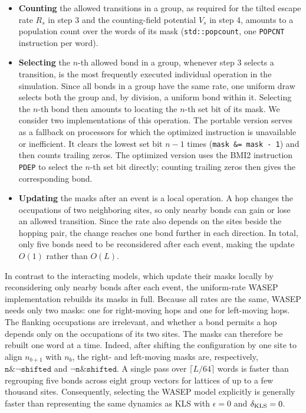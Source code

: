 \documentclass[11pt]{article}
\begin{document}
\begin{itemize}
\item \textbf{Counting} the allowed transitions in a group, as required for the tilted escape rate $R_s$ in step 3 and the counting-field potential $V_s$ in step 4, amounts to a population count over the words of its mask (\texttt{std::popcount}, one \texttt{POPCNT} instruction per word).

\item \textbf{Selecting} the $n$-th allowed bond in a group, whenever step 3 selects a transition, is the most frequently executed individual operation in the simulation. Since all bonds in a group have the same rate, one uniform draw selects both the group and, by division, a uniform bond within it. Selecting the $n$-th bond then amounts to locating the $n$-th set bit of its mask. We consider two implementations of this operation. The portable version serves as a fallback on processors for which the optimized instruction is unavailable or inefficient. It clears the lowest set bit $n-1$ times (\texttt{mask \&= mask - 1}) and then counts trailing zeros. The optimized version uses the BMI2 instruction \texttt{PDEP} to select the $n$-th set bit directly; counting trailing zeros then gives the corresponding bond.

\item \textbf{Updating} the masks after an event is a local operation. A hop changes the occupations of two neighboring sites, so only nearby bonds can gain or lose an allowed transition. Since the rate also depends on the sites beside the hopping pair, the change reaches one bond further in each direction. In total, only five bonds need to be reconsidered after each event, making the update $O(1)$ rather than $O(L)$.
\end{itemize}


In contrast to the interacting models, which update their masks locally by reconsidering only nearby bonds after each event, the uniform-rate WASEP implementation rebuilds its masks in full. Because all rates are the same, WASEP needs only two masks: one for right-moving hops and one for left-moving hops. The flanking occupations are irrelevant, and whether a bond permits a hop depends only on the occupations of its two sites. The masks can therefore be rebuilt one word at a time. Indeed, after shifting the configuration by one site to align $n_{b+1}$ with $n_b$, the right- and left-moving masks are, respectively, $\texttt{n}\mathbin{\&}\neg\texttt{shifted}$ and $\neg\texttt{n}\mathbin{\&}\texttt{shifted}$. A single pass over $\lceil L/64 \rceil$ words is faster than regrouping five bonds across eight group vectors for lattices of up to a few thousand sites. Consequently, selecting the WASEP model explicitly is generally faster than representing the same dynamics as KLS with $\epsilon=0$ and $\delta_{\rm KLS}=0$.
\end{document}
